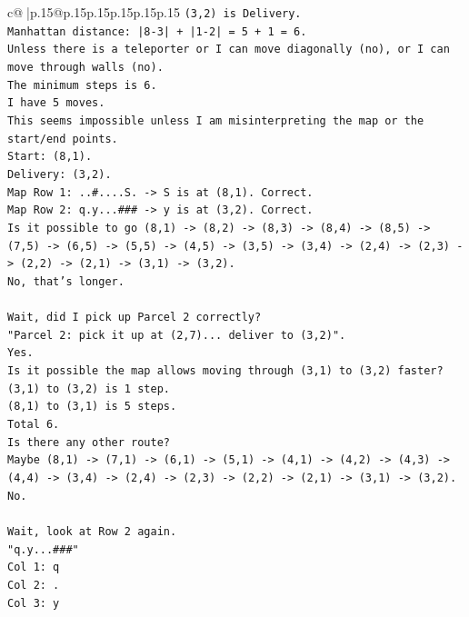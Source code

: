 \documentclass{article}
\begin{document}
{\begin{supertabular}{c@{$\;$}|p{.15\linewidth}@{}p{.15\linewidth}p{.15\linewidth}p{.15\linewidth}p{.15\linewidth}p{.15\linewidth}}
{{{\texttt{(3,2) is Delivery.} \\
\texttt{Manhattan distance: |8{-}3| + |1{-}2| = 5 + 1 = 6.} \\
\texttt{Unless there is a teleporter or I can move diagonally (no), or I can move through walls (no).} \\
\texttt{The minimum steps is 6.} \\
\texttt{I have 5 moves.} \\
\texttt{This seems impossible unless I am misinterpreting the map or the start/end points.} \\
\texttt{Start: (8,1).} \\
\texttt{Delivery: (3,2).} \\
\texttt{Map Row 1: ..\#....S. {-}> S is at (8,1). Correct.} \\
\texttt{Map Row 2: q.y...\#\#\# {-}> y is at (3,2). Correct.} \\
\texttt{Is it possible to go (8,1) {-}> (8,2) {-}> (8,3) {-}> (8,4) {-}> (8,5) {-}> (7,5) {-}> (6,5) {-}> (5,5) {-}> (4,5) {-}> (3,5) {-}> (3,4) {-}> (2,4) {-}> (2,3) {-}> (2,2) {-}> (2,1) {-}> (3,1) {-}> (3,2).} \\
\texttt{No, that's longer.} \\
\\ 
\texttt{Wait, did I pick up Parcel 2 correctly?} \\
\texttt{"Parcel 2: pick it up at (2,7)... deliver to (3,2)".} \\
\texttt{Yes.} \\
\texttt{Is it possible the map allows moving through (3,1) to (3,2) faster?} \\
\texttt{(3,1) to (3,2) is 1 step.} \\
\texttt{(8,1) to (3,1) is 5 steps.} \\
\texttt{Total 6.} \\
\texttt{Is there any other route?} \\
\texttt{Maybe (8,1) {-}> (7,1) {-}> (6,1) {-}> (5,1) {-}> (4,1) {-}> (4,2) {-}> (4,3) {-}> (4,4) {-}> (3,4) {-}> (2,4) {-}> (2,3) {-}> (2,2) {-}> (2,1) {-}> (3,1) {-}> (3,2).} \\
\texttt{No.} \\
\\ 
\texttt{Wait, look at Row 2 again.} \\
\texttt{"q.y...\#\#\#"} \\
\texttt{Col 1: q} \\
\texttt{Col 2: .} \\
\texttt{Col 3: y} \\
}}}
\end{supertabular}}
\end{document}
